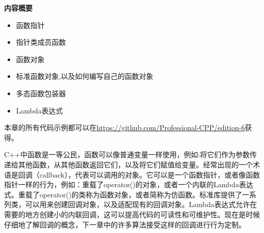 \noindent
\textbf{内容概要}

\begin{itemize}
\item
函数指针

\item
指针类成员函数

\item
函数对象

\item
标准函数对象,以及如何编写自己的函数对象

\item
多态函数包装器

\item
Lambda表达式
\end{itemize}

本章的所有代码示例都可以在\url{https://github.com/Professional-CPP/edition-6}获得。

C++中函数是一等公民，函数可以像普通变量一样使用，例如:将它们作为参数传递给其他函数，从其他函数返回它们，以及将它们赋值给变量。经常出现的一个术语是回调（callback），代表可以调用的对象。它可以是一个函数指针，或者像函数指针一样的行为，例如：重载了operator()的对象，或者一个内联的Lambda表达式。重载了operator()的类称为函数对象，或者简称为仿函数。标准库提供了一系列类，可以用来创建回调对象，以及适配现有的回调对象。Lambda表达式允许在需要的地方创建小的内联回调，这可以提高代码的可读性和可维护性。现在是时候仔细地了解回调的概念，下一章中的许多算法接受这样的回调进行行为定制。
